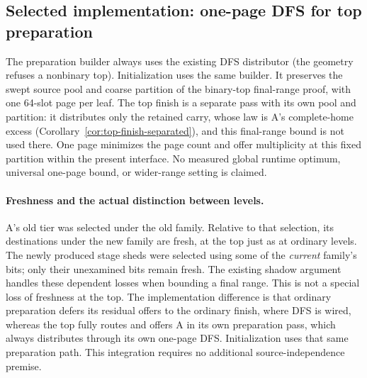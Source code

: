 \documentclass[11pt]{article}
\theoremstyle{definition}
\theoremstyle{remark}
\begin{document}
\subsection{Selected implementation: one-page DFS for top preparation}
\label{sec:top-dfs-decision}
The preparation builder always uses the existing DFS distributor (the
geometry refuses a nonbinary top). Initialization uses the same builder. It preserves the swept source pool and coarse partition of the
binary-top final-range proof, with one 64-slot page per leaf.
The top finish is a separate pass with its own pool and partition: it
distributes only the retained carry, whose law is A's complete-home excess
(Corollary~\ref{cor:top-finish-separated}), and this final-range bound is
not used there.
One page minimizes the page count and offer multiplicity at this fixed
partition within the present interface. No measured global runtime optimum,
universal one-page bound, or wider-range setting is claimed.

\paragraph{Freshness and the actual distinction between levels.}
A's old tier was selected under the old family. Relative to that selection,
its destinations under the new family are fresh, at the top just as at
ordinary levels. The newly produced stage sheds were selected using some
of the \emph{current} family's bits; only their unexamined bits remain
fresh. The existing shadow argument handles these dependent losses when
bounding a final range. This is not a special loss of freshness at the top.
The implementation difference is that ordinary preparation defers its
residual offers to the ordinary finish, where DFS is wired,
whereas the top fully routes and offers A in its own preparation pass,
which always distributes through its own one-page DFS. Initialization uses
that same preparation path. This integration requires no additional
source-independence premise.
\end{document}
